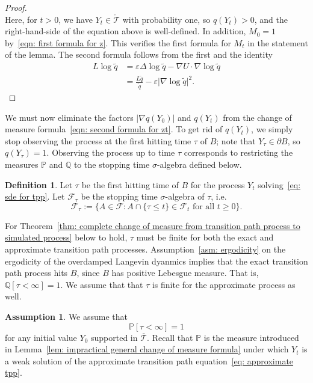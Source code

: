 \documentclass[reqno]{amsart}
\newcommand{\eps}{\varepsilon}
\newcommand{\1}{\mathds{1}}
\newcommand{\grad}{\nabla}
\newcommand{\lap}{\Delta}
\renewcommand{\P}{\mathds{P}}
\newcommand{\Q}{\mathds{Q}}
\newcommand{\F}{\mathcal{F}}
\newcommand{\zed}{M}
\theoremstyle{definition}
\newtheorem{assumption}{Assumption}
\newtheorem{definition}{Definition}
\theoremstyle{remark}
\newcommand{\D}{\mathscr{T}}
\begin{document}
\begin{proof}
\begin{equation*}
  \end{equation*}
  Here, for $t>0$, we have $Y_t \in \mathring{\D}$ with probability one, so $q(Y_t) >0$, and the right-hand-side of the equation above is well-defined.  In addition, $\zed_0=1$ by~\eqref{eqn: first formula for z}. This verifies the first formula for $\zed_t$ in the statement of the lemma.
  The second formula follows from the first and the identity
  \begin{align*}
    L \log \tilde q &= \eps \lap \log  \tilde q - \grad U \cdot \grad \log \tilde q \\
    &= \frac{L \tilde q}{\tilde q}  - \eps  \lvert \grad \log \tilde q \rvert^2.
  \end{align*}
\end{proof}

We must now eliminate the factors $\lvert \grad q(Y_0) \rvert$ and $q(Y_t)$ from the change of measure formula~\eqref{eqn: second formula for zt}. To get rid of $q(Y_t)$, we simply stop observing the process at the first hitting time $\tau$ of $B$; note that $Y_\tau \in \partial B$, so $q(Y_\tau)= 1$. Observing the process up to time $\tau$ corresponds to restricting the measures $\P$ and $\Q$ to the stopping time $\sigma$-algebra defined below.

\begin{definition}
  Let $\tau$ be the first hitting time of $B$ for the process $Y_t$ solving~\eqref{eq: sde for tpp}. Let $\F_\tau$ be the stopping time $\sigma$-algebra of $\tau$, i.e.
  \begin{equation*}
    \F_\tau := \{ A \in \F: A \cap \{ \tau \leq t\} \in \F_t \text{ for all } t \geq 0 \}.
  \end{equation*}
\end{definition}

For Theorem~\ref{thm: complete change of measure from transition path process to simulated process} below to hold, $\tau$ must be finite for both the exact and approximate transition path processes. Assumption~\ref{asm: ergodicity} on the ergodicity of the overdamped Langevin dyanmics implies that the exact transition path process hits $B$, since $B$ has positive Lebesgue measure. That is, $\Q[\tau < \infty] = 1$. We assume that that $\tau$ is finite for the approximate process as well. 

\begin{assumption}\label{asm: finite hitting time}
  We assume that 
  \begin{equation*}
     \P[\tau < \infty] = 1
  \end{equation*}
  for any initial value $Y_0$ supported in $\overline{\D}$. Recall that $\P$ is the measure introduced in Lemma~\ref{lem: impractical general change of measure formula} under which $Y_t$ is a weak solution of the approximate transition path equation~\eqref{eq: approximate tpp}.
\end{assumption}
\end{document}
